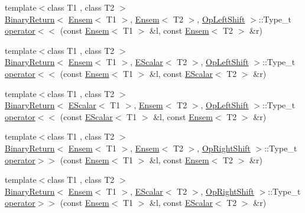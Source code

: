\begin{DoxyCompactItemize}
\item 
{\footnotesize template$<$class T1 , class T2 $>$ }\\\mbox{\hyperlink{structENSEM_1_1BinaryReturn}{Binary\+Return}}$<$ \mbox{\hyperlink{classENSEM_1_1Ensem}{Ensem}}$<$ T1 $>$, \mbox{\hyperlink{classENSEM_1_1Ensem}{Ensem}}$<$ T2 $>$, \mbox{\hyperlink{structENSEM_1_1OpLeftShift}{Op\+Left\+Shift}} $>$\+::Type\+\_\+t \mbox{\hyperlink{group__eensem_ga822a79ca0b7e9ffdd3c9fbfaad909967}{operator$<$$<$}} (const \mbox{\hyperlink{classENSEM_1_1Ensem}{Ensem}}$<$ T1 $>$ \&l, const \mbox{\hyperlink{classENSEM_1_1Ensem}{Ensem}}$<$ T2 $>$ \&r)
\item 
{\footnotesize template$<$class T1 , class T2 $>$ }\\\mbox{\hyperlink{structENSEM_1_1BinaryReturn}{Binary\+Return}}$<$ \mbox{\hyperlink{classENSEM_1_1Ensem}{Ensem}}$<$ T1 $>$, \mbox{\hyperlink{classENSEM_1_1EScalar}{E\+Scalar}}$<$ T2 $>$, \mbox{\hyperlink{structENSEM_1_1OpLeftShift}{Op\+Left\+Shift}} $>$\+::Type\+\_\+t \mbox{\hyperlink{group__eensem_ga6651d0e3a61fd80d621e17a1ae4496af}{operator$<$$<$}} (const \mbox{\hyperlink{classENSEM_1_1Ensem}{Ensem}}$<$ T1 $>$ \&l, const \mbox{\hyperlink{classENSEM_1_1EScalar}{E\+Scalar}}$<$ T2 $>$ \&r)
\item 
{\footnotesize template$<$class T1 , class T2 $>$ }\\\mbox{\hyperlink{structENSEM_1_1BinaryReturn}{Binary\+Return}}$<$ \mbox{\hyperlink{classENSEM_1_1EScalar}{E\+Scalar}}$<$ T1 $>$, \mbox{\hyperlink{classENSEM_1_1Ensem}{Ensem}}$<$ T2 $>$, \mbox{\hyperlink{structENSEM_1_1OpLeftShift}{Op\+Left\+Shift}} $>$\+::Type\+\_\+t \mbox{\hyperlink{group__eensem_ga8276aea8565989d936393895688a0a95}{operator$<$$<$}} (const \mbox{\hyperlink{classENSEM_1_1EScalar}{E\+Scalar}}$<$ T1 $>$ \&l, const \mbox{\hyperlink{classENSEM_1_1Ensem}{Ensem}}$<$ T2 $>$ \&r)
\item 
{\footnotesize template$<$class T1 , class T2 $>$ }\\\mbox{\hyperlink{structENSEM_1_1BinaryReturn}{Binary\+Return}}$<$ \mbox{\hyperlink{classENSEM_1_1Ensem}{Ensem}}$<$ T1 $>$, \mbox{\hyperlink{classENSEM_1_1Ensem}{Ensem}}$<$ T2 $>$, \mbox{\hyperlink{structENSEM_1_1OpRightShift}{Op\+Right\+Shift}} $>$\+::Type\+\_\+t \mbox{\hyperlink{group__eensem_ga8b0f105a14d5692cffad3db6bae659fb}{operator$>$$>$}} (const \mbox{\hyperlink{classENSEM_1_1Ensem}{Ensem}}$<$ T1 $>$ \&l, const \mbox{\hyperlink{classENSEM_1_1Ensem}{Ensem}}$<$ T2 $>$ \&r)
\item 
{\footnotesize template$<$class T1 , class T2 $>$ }\\\mbox{\hyperlink{structENSEM_1_1BinaryReturn}{Binary\+Return}}$<$ \mbox{\hyperlink{classENSEM_1_1Ensem}{Ensem}}$<$ T1 $>$, \mbox{\hyperlink{classENSEM_1_1EScalar}{E\+Scalar}}$<$ T2 $>$, \mbox{\hyperlink{structENSEM_1_1OpRightShift}{Op\+Right\+Shift}} $>$\+::Type\+\_\+t \mbox{\hyperlink{group__eensem_ga1741fb098dc44e2f5fcd2bcabeafa0ed}{operator$>$$>$}} (const \mbox{\hyperlink{classENSEM_1_1Ensem}{Ensem}}$<$ T1 $>$ \&l, const \mbox{\hyperlink{classENSEM_1_1EScalar}{E\+Scalar}}$<$ T2 $>$ \&r)

\end{DoxyCompactItemize}

